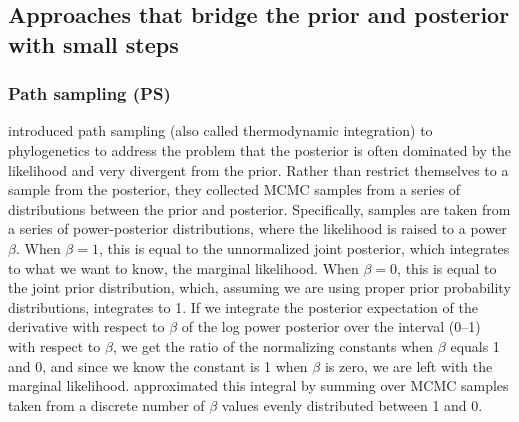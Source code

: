 \subsection{Approaches that bridge the prior and posterior with small steps}

\subsubsection{Path sampling (PS)}
\citet{Lartillot2006} introduced path sampling 
(also called thermodynamic integration) to phylogenetics to address the problem
that the posterior is often dominated by the likelihood and very divergent from
the prior.
Rather than restrict themselves to a sample from the posterior, they collected
MCMC samples from a series of distributions between the prior and posterior.
Specifically, samples are taken from a series of power-posterior distributions,
where the likelihood is raised to a power $\beta$.
When $\beta = 1$, this is equal to the unnormalized joint posterior, which
integrates to what we want to know, the marginal likelihood.
When $\beta = 0$, this is equal to the joint prior distribution, which,
assuming we are using proper prior probability distributions, integrates to 1.
If we integrate the  posterior expectation of the derivative
with respect to $\beta$ of the log power posterior
over the interval (0--1) with respect to $\beta$,
we get the  ratio of the normalizing constants when $\beta$
equals 1 and 0, and since we know the constant is 1 when $\beta$ is zero, we
are left with the marginal likelihood.
\citet{Lartillot2006} approximated this integral by
summing over MCMC samples taken from a discrete number of $\beta$ values evenly
distributed between 1 and 0.

